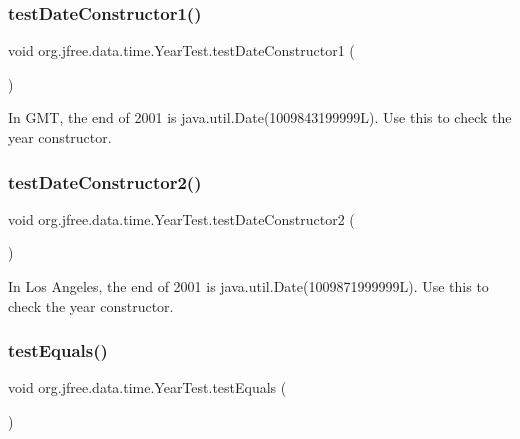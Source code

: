 \subsubsection{\texorpdfstring{test\+Date\+Constructor1()}{testDateConstructor1()}}
{\footnotesize\ttfamily void org.\+jfree.\+data.\+time.\+Year\+Test.\+test\+Date\+Constructor1 (\begin{DoxyParamCaption}{ }\end{DoxyParamCaption})}

In G\+MT, the end of 2001 is java.\+util.\+Date(1009843199999\+L). Use this to check the year constructor. \mbox{\label{classorg_1_1jfree_1_1data_1_1time_1_1_year_test_a9741cdf4a8467337a85298c592969122}} 
\subsubsection{\texorpdfstring{test\+Date\+Constructor2()}{testDateConstructor2()}}
{\footnotesize\ttfamily void org.\+jfree.\+data.\+time.\+Year\+Test.\+test\+Date\+Constructor2 (\begin{DoxyParamCaption}{ }\end{DoxyParamCaption})}

In Los Angeles, the end of 2001 is java.\+util.\+Date(1009871999999\+L). Use this to check the year constructor. \mbox{\label{classorg_1_1jfree_1_1data_1_1time_1_1_year_test_a22b0724e0d3ff3dd28e20f5cb96b7fb6}} 
\subsubsection{\texorpdfstring{test\+Equals()}{testEquals()}}
{\footnotesize\ttfamily void org.\+jfree.\+data.\+time.\+Year\+Test.\+test\+Equals (\begin{DoxyParamCaption}{ }\end{DoxyParamCaption})}

